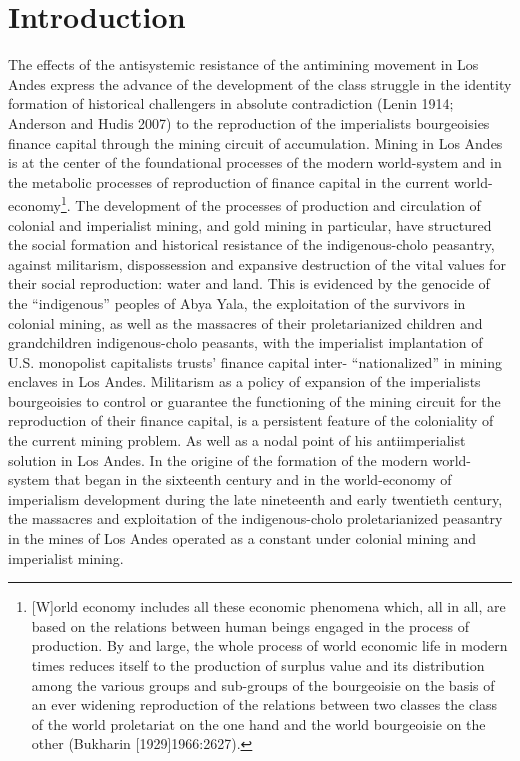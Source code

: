 \documentclass[]{interact}
\theoremstyle{plain}%
\theoremstyle{definition}
\theoremstyle{remark}
\begin{document}
\section{Introduction}
The effects of the antisystemic resistance of the antimining movement in Los Andes express the advance of the development of the class struggle in the identity formation of historical challengers in absolute contradiction (Lenin 1914; Anderson and Hudis 2007) to the reproduction of the imperialists bourgeoisies finance capital through the mining circuit of accumulation.
Mining in Los Andes is at the center of the foundational processes of the modern world-system and in the metabolic processes of reproduction of finance capital in the current world-economy\footnote{[W]orld economy includes all these economic phenomena which, all in all, are based on the relations between human beings engaged in the process of production. By and large, the whole process of world economic life in modern times reduces itself to the production of surplus value and its distribution among the various groups and sub-groups of the bourgeoisie on the basis of an ever widening reproduction of the relations between two classes the class of the world proletariat on the one hand and the world bourgeoisie on the other (Bukharin [1929]1966:2627).}. The development of the processes of production and circulation of colonial and imperialist mining, and gold mining in particular, have structured the social formation and historical resistance of the indigenous-cholo peasantry, against militarism, dispossession and expansive destruction of the vital values for their social reproduction: water and land.
This is evidenced by the genocide of the “indigenous” peoples of Abya Yala, the exploitation of the survivors in colonial mining, as well as the massacres of their proletarianized children and grandchildren indigenous-cholo peasants, with the imperialist implantation of U.S. monopolist capitalists trusts’ finance capital inter- “nationalized” in mining enclaves in Los Andes. Militarism as a policy of expansion of the imperialists bourgeoisies to control or guarantee the functioning of the mining circuit for the reproduction of their finance capital, is a persistent feature of the coloniality of the current mining problem. As well as a nodal point of his antiimperialist solution in Los Andes. In the origine of the formation of the modern world-system that began in the sixteenth century and in the world-economy of imperialism development during the late nineteenth and early twentieth century, the massacres and exploitation of the indigenous-cholo proletarianized peasantry in the mines of Los Andes operated as a constant under colonial mining and imperialist mining.
\end{document}
